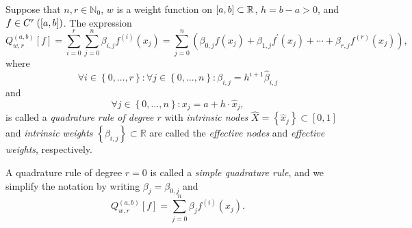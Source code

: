 \begin{frame}
    \begin{definition}
        Suppose that $n,r\in\mathbb{N}_{0}$,
        $w$ is a weight function on
        \begin{math}
            \left[a,b\right]\subset
            \mathbb{R}
        \end{math},
        $h=b-a>0$, and
        \begin{math}
            f\in
            C^{r}\left(
            \left[a,b\right]
            \right)
        \end{math}.
        The expression
        \begin{equation*}
            Q^{\left(a,b\right)}_{w,r}
            \left[f\right]=
            \sum_{i=0}^{r}
            \sum_{j=0}^{n}
            \beta_{i,j}
            f^{\left(i\right)}
            \left(x_{j}\right)=
            \sum_{j=0}^{n}
            \left(
            \beta_{0,j}
            f\left(x_{j}\right)+
            \beta_{1,j}
            f^{\prime}
            \left(x_{j}\right)+
            \cdots+
            \beta_{r,j}
            f^{\left(r\right)}
            \left(x_{j}\right)
            \right),
        \end{equation*}
        where
        \begin{equation*}
            \forall i\in
            \left\{0,\dotsc,r\right\}:
            \forall j\in
            \left\{0,\dotsc,n\right\}:
            \beta_{i,j}=
            h^{i+1}
            \widehat{\beta}_{i,j}
        \end{equation*}
        and
        \begin{equation*}
            \forall j\in
            \left\{0,\dotsc,n\right\}:
            x_{j}=
            a+
            h\cdot
            \widehat{x}_{j},
        \end{equation*}
        is called a \emph{quadrature rule of degree $r$} with
        \emph{intrinsic nodes}
        \begin{math}
            \widehat{X}=
            \left\{
            \widehat{x}_{j}
            \right\}\subset
            \left[0,1\right]
        \end{math}
        and \emph{intrinsic weights}
        \begin{math}
            \left\{
            \beta_{i,j}
            \right\}
            \subset
            \mathbb{R}
        \end{math}
        are called the \emph{effective nodes} and
        \emph{effective weights}, respectively.
    \end{definition}
    A quadrature rule of degree $r=0$ is called a
    \emph{simple quadrature rule}, and we simplify the notation
    by writing $\beta_{j}=\beta_{0,j}$ and
    \begin{equation*}
        Q^{\left(a,b\right)}_{w,r}
        \left[f\right]=
        \sum_{j=0}^{n}
        \beta_{j}
        f^{\left(i\right)}
        \left(x_{j}\right).
    \end{equation*}
\end{frame}

